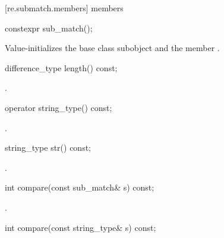 [re.submatch.members]{ members}

%
\begin{itemdecl}
constexpr sub_match();
\end{itemdecl}

\begin{itemdescr}
\pnum
\effects Value-initializes the  base class subobject and the member
.
\end{itemdescr}

%
\begin{itemdecl}
difference_type length() const;
\end{itemdecl}

\begin{itemdescr}
\pnum\returns  {}.
\end{itemdescr}

%
\begin{itemdecl}
operator string_type() const;
\end{itemdecl}

\begin{itemdescr}
\pnum\returns {}.
\end{itemdescr}

%
\begin{itemdecl}
string_type str() const;
\end{itemdecl}

\begin{itemdescr}
\pnum\returns  {}.
\end{itemdescr}

%
\begin{itemdecl}
int compare(const sub_match& s) const;
\end{itemdecl}

\begin{itemdescr}
\pnum\returns  {}.
\end{itemdescr}

%
\begin{itemdecl}
int compare(const string_type& s) const;
\end{itemdecl}

